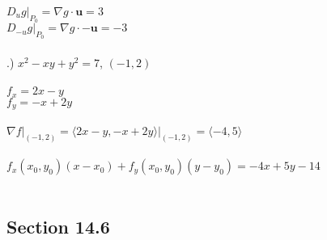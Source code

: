 \documentclass[12pt]{article}
\begin{document}
\noindent $D_{u}g\Big|_{P_{0}} = \nabla g \cdot \mathbf{u} = 3$\\
\noindent $D_{-u}g\Big|_{P_{0}} = \nabla g \cdot -\mathbf{u} = -3$\\\\
.) $x^{2} -xy + y^{2} = 7$, \hspace{10pt} $(-1, 2)$ \\\\
\noindent $f_{x} = 2x - y$\\
\noindent $f_{y} = -x + 2y$\\\\
\noindent $\nabla f \Big|_{(-1, 2)} = \langle 2x-y, -x+2y\rangle \Big|_{(-1, 2)} = \langle -4, 5\rangle$ \\\\
\noindent $f_{x}(x_{0}, y_{0})(x-x_{0}) + f_{y}(x_{0}, y_{0})(y-y_{0}) = -4x + 5y - 14$\\\\



\subsection*{Section 14.6}
\end{document}
